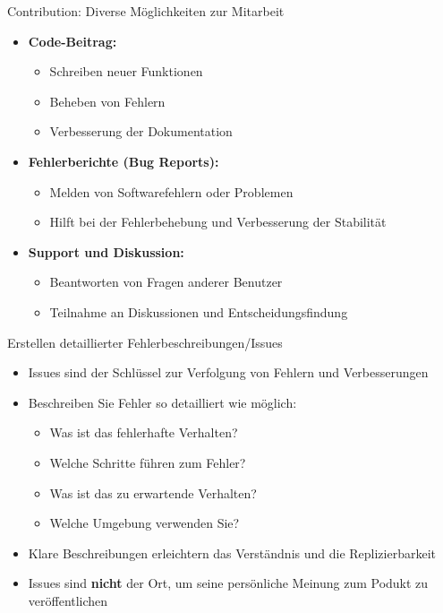\documentclass[compress,aspectratio=169]{beamer}
\begin{document}
	\begin{frame}{Contribution: Diverse Möglichkeiten zur Mitarbeit}
		\begin{itemize}
			\item \textbf{Code-Beitrag:}
				\begin{itemize}
					\item Schreiben neuer Funktionen
					\item Beheben von Fehlern
					\item Verbesserung der Dokumentation
				\end{itemize}
			\item \textbf{Fehlerberichte (Bug Reports):}
				\begin{itemize}
					\item Melden von Softwarefehlern oder Problemen
					\item Hilft bei der Fehlerbehebung und Verbesserung der Stabilität
				\end{itemize}
			\item \textbf{Support und Diskussion:}
				\begin{itemize}
					\item Beantworten von Fragen anderer Benutzer
					\item Teilnahme an Diskussionen und Entscheidungsfindung
				\end{itemize}
		\end{itemize}
	\end{frame}

	\begin{frame}{Erstellen detaillierter Fehlerbeschreibungen/Issues}
		\begin{itemize}
			\item Issues sind der Schlüssel zur Verfolgung von Fehlern und Verbesserungen
			\item Beschreiben Sie Fehler so detailliert wie möglich:
			\begin{itemize}
				\item Was ist das fehlerhafte Verhalten?
				\item Welche Schritte führen zum Fehler?
				\item Was ist das zu erwartende Verhalten?
				\item Welche Umgebung verwenden Sie?
			\end{itemize}
			\item Klare Beschreibungen erleichtern das Verständnis und die Replizierbarkeit
			\vspace{2em}
			\item Issues sind \textbf{nicht} der Ort, um seine persönliche Meinung zum Podukt zu veröffentlichen
		\end{itemize}
	\end{frame}
\end{document}
